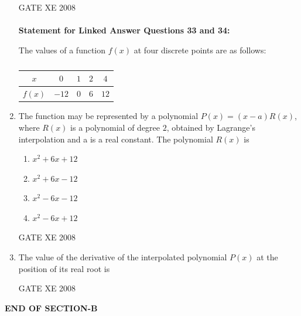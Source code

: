 \documentclass[12pt]{article}
\begin{document}
\begin{enumerate}
GATE XE 2008
\\ \\
\textbf{Statement for Linked Answer Questions 33 and 34:}

The values of a function $f(x)$ at four discrete points are as follows:
\begin{center}
\begin{table}[H]     \centering     \caption{}     \label{}     \begin{tabular}{|c|c|c|c|c|}
\hline
   $x$  & $0$ & $1$ & $2$ & $4$\\
   \hline
  $f(x)$   & $-12$ & $0$ & $6$ & $12$\\
  \hline
\end{tabular} \end{table}
\end{center}

\item  The function may be represented by a polynomial $P(x)=(x-a)R(x)$, where $R(x)$ is a polynomial of degree $2$, obtained by Lagrange's interpolation and a is a real constant. The polynomial $R(x)$ is

\begin{enumerate}
\item  $x^2+6x+12$
\item  $x^2+6x-12$
\item  $x^2-6x-12$
\item  $x^2-6x+12$
\end{enumerate}

GATE XE 2008
\item The value of the derivative of the interpolated polynomial $P(x)$ at the position of its real root is

\begin{enumerate}
\end{enumerate}

GATE XE 2008







\end{enumerate}
    


\begin{center}
    \textbf{END OF SECTION-B}
\end{center}
\end{document}
